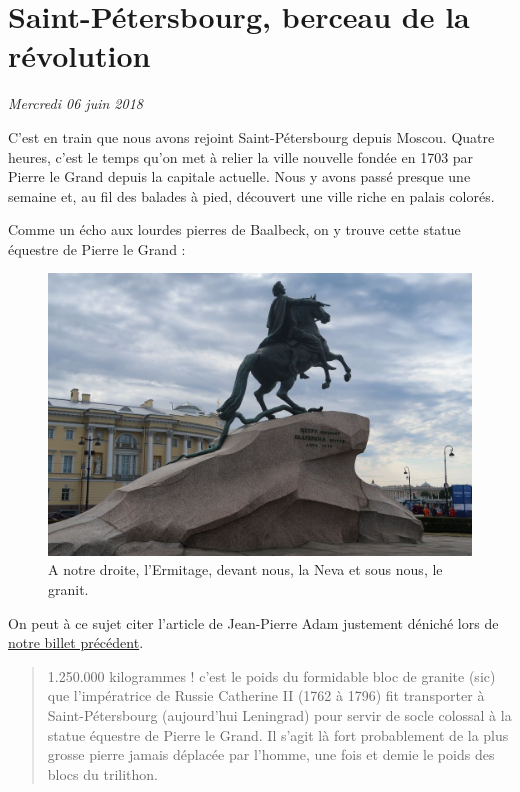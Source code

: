 \hypertarget{saint-puxe9tersbourg-berceau-de-la-ruxe9volution}{%
\section{Saint-Pétersbourg, berceau de la
révolution}\label{saint-puxe9tersbourg-berceau-de-la-ruxe9volution}}

\emph{Mercredi 06 juin 2018}

C'est en train que nous avons rejoint Saint-Pétersbourg depuis Moscou.
Quatre heures, c'est le temps qu'on met à relier la ville nouvelle
fondée en 1703 par Pierre le Grand depuis la capitale actuelle. Nous y
avons passé presque une semaine et, au fil des balades à pied, découvert
une ville riche en palais colorés.

Comme un écho aux lourdes pierres de Baalbeck, on y trouve cette statue
équestre de Pierre le Grand :

\begin{figure}
\centering
\includegraphics{images/20180606_pierre.JPG}
\caption{A notre droite, l'Ermitage, devant nous, la Neva et sous nous,
le granit.}
\end{figure}

On peut à ce sujet citer l'article de Jean-Pierre Adam justement déniché
lors de \href{/au-revoir-liban.html}{notre billet précédent}.

\begin{quote}
1.250.000 kilogrammes ! c'est le poids du formidable bloc de granite
(sic) que l'impératrice de Russie Catherine II (1762 à 1796) fit
transporter à Saint-Pétersbourg (aujourd'hui Leningrad) pour servir de
socle colossal à la statue équestre de Pierre le Grand. Il s'agit là
fort probablement de la plus grosse pierre jamais déplacée par l'homme,
une fois et demie le poids des blocs du trilithon.
\end{quote}

